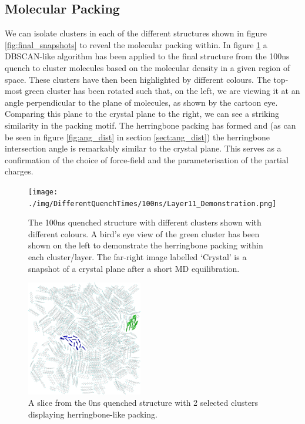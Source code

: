 \subsection{Molecular Packing}
\noindent We can isolate clusters in each of the different structures shown in figure \ref{fig:final_snapshots} to reveal the molecular packing within. In figure \ref{fig:Layer11} a DBSCAN-like algorithm has been applied to the final structure from the 100ns quench to cluster molecules based on the molecular density in a given region of space. These clusters have then been highlighted by different colours. The top-most green cluster has been rotated such that, on the left, we are viewing it at an angle perpendicular to the plane of molecules, as shown by the cartoon eye. Comparing this plane to the crystal plane to the right, we can see a striking similarity in the packing motif. The herringbone packing has formed and (as can be seen in figure \ref{fig:ang_dist} in section \ref{sect:ang_dist}) the herringbone intersection angle is remarkably similar to the crystal plane. This serves as a confirmation of the choice of force-field and the parameterisation of the partial charges.
\begin{figure}[ht]
	\texttt{[image: ./img/DifferentQuenchTimes/100ns/Layer11\_Demonstration.png]}
	\caption{\label{fig:Layer11}The 100ns quenched structure with different clusters shown with different colours. A bird's eye view of the green cluster has been shown on the left to demonstrate the herringbone packing within each cluster/layer. The far-right image labelled `Crystal' is a snapshot of a crystal plane after a short MD equilibration.}
\end{figure}
\begin{figure}
	\centering
	\includegraphics[width=0.45\textwidth]{./img/DifferentQuenchTimes/0ns/Slice6_4Clusters.png}
	\caption{\label{fig:ClustInst}A slice from the 0ns quenched structure with 2 selected clusters displaying herringbone-like packing.}
\end{figure}
